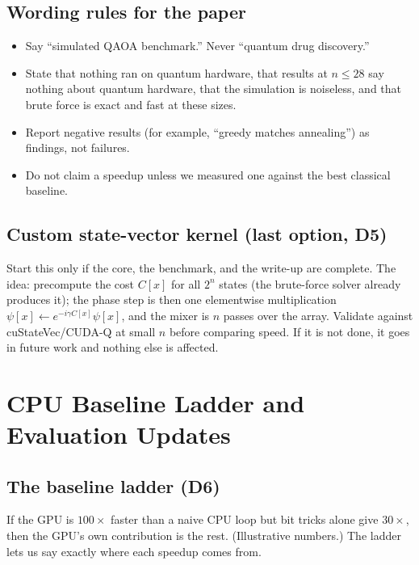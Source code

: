 \subsection{Wording rules for the paper}

\begin{itemize}[nosep]
  \item Say ``simulated QAOA benchmark.'' Never ``quantum drug discovery.''
  \item State that nothing ran on quantum hardware, that results at
        $n\le 28$ say nothing about quantum hardware, that the simulation is
        noiseless, and that brute force is exact and fast at these sizes.
  \item Report negative results (for example, ``greedy matches annealing'')
        as findings, not failures.
  \item Do not claim a speedup unless we measured one against the best
        classical baseline.
\end{itemize}

\subsection{Custom state-vector kernel (last option, D5)}

Start this only if the core, the benchmark, and the write-up are complete.
The idea: precompute the cost $C[x]$ for all $2^n$ states (the brute-force
solver already produces it); the phase step is then one elementwise
multiplication $\psi[x]\leftarrow e^{-i\gamma C[x]}\psi[x]$, and the mixer is
$n$ passes over the array. Validate against cuStateVec/CUDA-Q at small $n$
before comparing speed. If it is not done, it goes in future work and nothing
else is affected.

\section{CPU Baseline Ladder and Evaluation Updates}
\label{app:baselines}

\subsection{The baseline ladder (D6)}
\label{sec:ladder}

\begin{plain}
If the GPU is $100\times$ faster than a naive CPU loop but bit tricks alone
give $30\times$, then the GPU's own contribution is the rest. (Illustrative
numbers.) The ladder lets us say exactly where each speedup comes from.
\end{plain}

